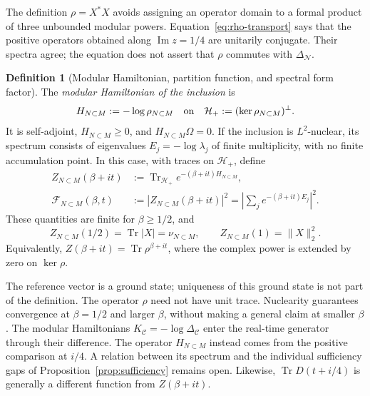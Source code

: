 \documentclass[a4paper,11pt]{article}
\theoremstyle{definition}
\newtheorem{definition}{Definition}[section]
\begin{document}
The definition $\rho=X^*X$ avoids assigning an operator domain to a formal product of three unbounded modular powers. Equation~\eqref{eq:rho-transport} says that the positive operators obtained along $\operatorname{Im}z=1/4$ are unitarily conjugate. Their spectra agree; the equation does not assert that $\rho$ commutes with $\Delta_{\mathcal N}$.

\begin{definition}[Modular Hamiltonian, partition function, and spectral form factor]\label{def:modular-SFF}
The \emph{modular Hamiltonian of the inclusion} is
\begin{equation}
 H_{N\subset M}:=-\log\rho_{N\subset M}
 \quad\hbox{on}\quad
 \mathcal H_+:=(\ker\rho_{N\subset M})^\perp.
 \label{eq:inclusion-H}
\end{equation}
It is self-adjoint, $H_{N\subset M}\ge0$, and $H_{N\subset M}\Omega=0$. If the inclusion is $L^2$-nuclear, its spectrum consists of eigenvalues $E_j=-\log\lambda_j$ of finite multiplicity, with no finite accumulation point. In this case, with traces on $\mathcal H_+$, define
\begin{align}
 Z_{N\subset M}(\beta+it)
   &:=\operatorname{Tr}_{\mathcal H_+}e^{-(\beta+it)H_{N\subset M}},\nonumber\\
 \mathcal F_{N\subset M}(\beta,t)
   &:=|Z_{N\subset M}(\beta+it)|^2
     =\left|\sum_j e^{-(\beta+it)E_j}\right|^2.
 \label{eq:modular-SFF}
\end{align}
These quantities are finite for $\beta\ge1/2$, and
\begin{equation}
 Z_{N\subset M}(1/2)=\operatorname{Tr}|X|=\nu_{N\subset M},
 \qquad Z_{N\subset M}(1)=\|X\|_2^2.
 \label{eq:Z-half}
\end{equation}
Equivalently, $Z(\beta+it)=\operatorname{Tr}\rho^{\beta+it}$, where the complex power is extended by zero on $\ker\rho$.
\end{definition}

The reference vector is a ground state; uniqueness of this ground state is not part of the definition. The operator $\rho$ need not have unit trace. Nuclearity guarantees convergence at $\beta=1/2$ and larger $\beta$, without making a general claim at smaller $\beta$. The modular Hamiltonians $K_{\mathcal C}=-\log\Delta_{\mathcal C}$ enter the real-time generator through their difference. The operator $H_{N\subset M}$ instead comes from the positive comparison at $i/4$. A relation between its spectrum and the individual sufficiency gaps of Proposition~\ref{prop:sufficiency} remains open. Likewise, $\operatorname{Tr}D(t+i/4)$ is generally a different function from $Z(\beta+it)$.
\end{document}
